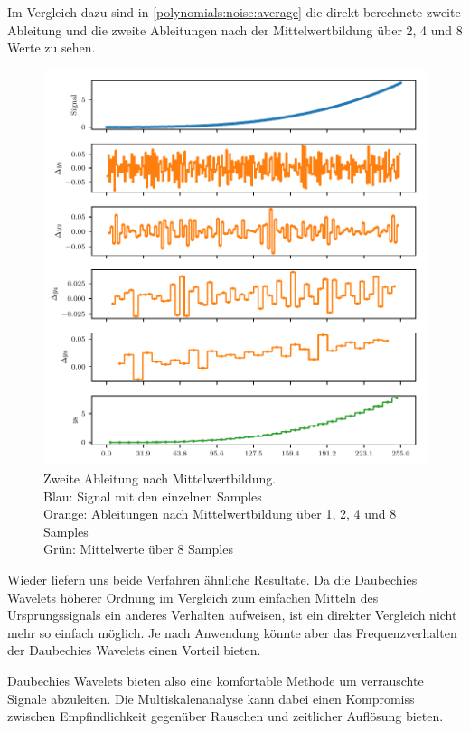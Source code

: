 \begin{refsection}
Im Vergleich dazu sind in \cref{polynomials:noise:average} die direkt
berechnete zweite Ableitung und die zweite Ableitungen nach der
Mittelwertbildung über 2, 4 und 8 Werte zu sehen.
\begin{figure}
    \centering
    \includegraphics{papers/polynomials/images/polynomials_noise_moving_average_2nd.pdf}
    \caption{Zweite Ableitung nach Mittelwertbildung.\\
        Blau: Signal mit den einzelnen Samples\\
        Orange: Ableitungen nach Mittelwertbildung über 1, 2, 4 und 8 Samples\\
        Grün: Mittelwerte über 8 Samples\label{polynomials:noise:average2nd}}
\end{figure}
Wieder liefern uns beide Verfahren ähnliche Resultate. Da die Daubechies
Wavelets höherer Ordnung im Vergleich zum einfachen Mitteln des
Ursprungssignals ein anderes Verhalten aufweisen, ist ein direkter Vergleich
nicht mehr so einfach möglich. Je nach Anwendung könnte aber das
Frequenzverhalten der Daubechies Wavelets einen Vorteil bieten.

Daubechies Wavelets bieten also eine komfortable Methode um verrauschte Signale
abzuleiten. Die Multiskalenanalyse kann dabei einen Kompromiss zwischen
Empfindlichkeit gegenüber Rauschen und zeitlicher Auflösung bieten.


\end{refsection}
